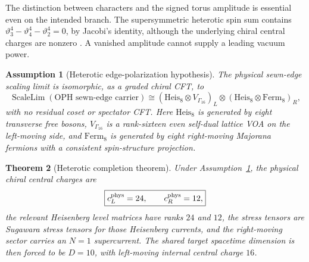 \documentclass[11pt]{article}
\newtheorem{theorem}{Theorem}[section]
\newtheorem{assumption}[theorem]{Assumption}
\theoremstyle{remark}
\theoremstyle{plain}
\begin{document}
The distinction between characters and the signed torus amplitude is
essential even on the intended branch. The supersymmetric heterotic
spin sum contains
\(\vartheta_3^4-\vartheta_4^4-\vartheta_2^4=0\), by Jacobi's identity,
although the underlying chiral central charges are nonzero
\cite{AlvarezGaumeVazquezMozo1992}. A vanished amplitude cannot supply a
leading vacuum power.

\begin{assumption}[Heterotic edge-polarization hypothesis]\label{ass:heterotic-edge-polarization}
The physical sewn-edge scaling limit is isomorphic, as a graded chiral CFT, to
\[
\operatorname{ScaleLim}(\text{OPH sewn-edge carrier})
\cong
\left(\mathrm{Heis}_8\otimes V_{\Gamma_{16}}\right)_L
\otimes
\left(\mathrm{Heis}_8\otimes \mathrm{Ferm}_8\right)_R,
\]
with no residual coset or spectator CFT. Here \(\mathrm{Heis}_8\) is generated by eight transverse
free bosons, \(V_{\Gamma_{16}}\) is a rank-sixteen even self-dual lattice VOA on the left-moving
side, and \(\mathrm{Ferm}_8\) is generated by eight right-moving Majorana fermions with a
consistent spin-structure projection.
\end{assumption}

\begin{theorem}[Heterotic completion theorem]
Under Assumption~\ref{ass:heterotic-edge-polarization}, the physical chiral central charges are
\[
\boxed{c_L^{\rm phys}=24,\qquad c_R^{\rm phys}=12,}
\]
the relevant Heisenberg level matrices have ranks \(24\) and \(12\), the stress tensors are
Sugawara stress tensors for those Heisenberg currents, and the right-moving sector carries an
\(N=1\) supercurrent. The shared target spacetime dimension is then forced to be \(D=10\), with
left-moving internal central charge \(16\).
\end{theorem}
\end{document}
